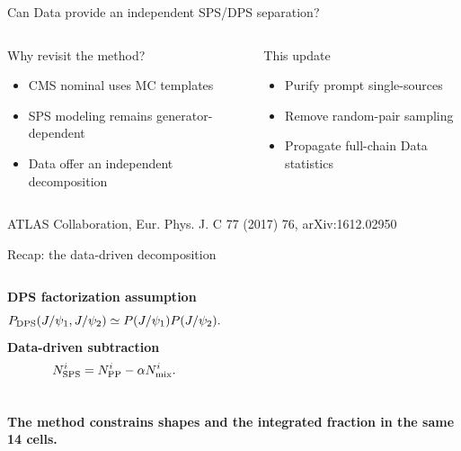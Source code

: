 \documentclass[11pt,aspectratio=169]{beamer}
\newcommand{\atlasref}{\textcolor{neutral}{\scriptsize ATLAS Collaboration, Eur. Phys. J. C 77 (2017) 76, arXiv:1612.02950}}
\begin{document}
\begin{frame}[plain,label=title]
  \titlepage
\end{frame}

\begin{frame}[label=p02]{Can Data provide an independent SPS/DPS separation?}
\begin{columns}[T]
\begin{block}{Why revisit the method?}
\begin{itemize}
  \item CMS nominal uses MC templates
  \item SPS modeling remains generator-dependent
  \item Data offer an independent decomposition
\end{itemize}
\end{block}
\begin{exampleblock}{This update}
\begin{itemize}
  \item Purify prompt single-\Jpsi sources
  \item Remove random-pair sampling
  \item Propagate full-chain Data statistics
\end{itemize}
\end{exampleblock}
\end{columns}
\vfill
\centering
{}
\vfill
\atlasref
\end{frame}

\begin{frame}[label=p03]{Recap: the data-driven decomposition}
\centering
{}
\vspace{0.45cm}
\begin{columns}[T]
\textbf{DPS factorization assumption}
\[
P_{\rm DPS}(J/\psi_1,J/\psi_2)\simeq P(J/\psi_1)P(J/\psi_2).
\]
\textbf{Data-driven subtraction}
\[
N_{\rm SPS}^{i}=N_{\rm PP}^{i}-\alpha N_{\rm mix}^{i}.
\]
\end{columns}
\vfill
\centering\textbf{The method constrains shapes and the integrated fraction in the same 14 cells.}
\end{frame}
\end{document}
